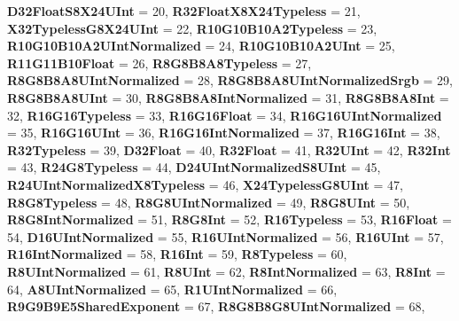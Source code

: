 \begin{DoxyCompactItemize}
\newline
{\bfseries D32\+Float\+S8\+X24\+U\+Int} = 20, 
{\bfseries R32\+Float\+X8\+X24\+Typeless} = 21, 
{\bfseries X32\+Typeless\+G8\+X24\+U\+Int} = 22, 
{\bfseries R10\+G10\+B10\+A2\+Typeless} = 23, 
\newline
{\bfseries R10\+G10\+B10\+A2\+U\+Int\+Normalized} = 24, 
{\bfseries R10\+G10\+B10\+A2\+U\+Int} = 25, 
{\bfseries R11\+G11\+B10\+Float} = 26, 
{\bfseries R8\+G8\+B8\+A8\+Typeless} = 27, 
\newline
{\bfseries R8\+G8\+B8\+A8\+U\+Int\+Normalized} = 28, 
{\bfseries R8\+G8\+B8\+A8\+U\+Int\+Normalized\+Srgb} = 29, 
{\bfseries R8\+G8\+B8\+A8\+U\+Int} = 30, 
{\bfseries R8\+G8\+B8\+A8\+Int\+Normalized} = 31, 
\newline
{\bfseries R8\+G8\+B8\+A8\+Int} = 32, 
{\bfseries R16\+G16\+Typeless} = 33, 
{\bfseries R16\+G16\+Float} = 34, 
{\bfseries R16\+G16\+U\+Int\+Normalized} = 35, 
\newline
{\bfseries R16\+G16\+U\+Int} = 36, 
{\bfseries R16\+G16\+Int\+Normalized} = 37, 
{\bfseries R16\+G16\+Int} = 38, 
{\bfseries R32\+Typeless} = 39, 
\newline
{\bfseries D32\+Float} = 40, 
{\bfseries R32\+Float} = 41, 
{\bfseries R32\+U\+Int} = 42, 
{\bfseries R32\+Int} = 43, 
\newline
{\bfseries R24\+G8\+Typeless} = 44, 
{\bfseries D24\+U\+Int\+Normalized\+S8\+U\+Int} = 45, 
{\bfseries R24\+U\+Int\+Normalized\+X8\+Typeless} = 46, 
{\bfseries X24\+Typeless\+G8\+U\+Int} = 47, 
\newline
{\bfseries R8\+G8\+Typeless} = 48, 
{\bfseries R8\+G8\+U\+Int\+Normalized} = 49, 
{\bfseries R8\+G8\+U\+Int} = 50, 
{\bfseries R8\+G8\+Int\+Normalized} = 51, 
\newline
{\bfseries R8\+G8\+Int} = 52, 
{\bfseries R16\+Typeless} = 53, 
{\bfseries R16\+Float} = 54, 
{\bfseries D16\+U\+Int\+Normalized} = 55, 
\newline
{\bfseries R16\+U\+Int\+Normalized} = 56, 
{\bfseries R16\+U\+Int} = 57, 
{\bfseries R16\+Int\+Normalized} = 58, 
{\bfseries R16\+Int} = 59, 
\newline
{\bfseries R8\+Typeless} = 60, 
{\bfseries R8\+U\+Int\+Normalized} = 61, 
{\bfseries R8\+U\+Int} = 62, 
{\bfseries R8\+Int\+Normalized} = 63, 
\newline
{\bfseries R8\+Int} = 64, 
{\bfseries A8\+U\+Int\+Normalized} = 65, 
{\bfseries R1\+U\+Int\+Normalized} = 66, 
{\bfseries R9\+G9\+B9\+E5\+Shared\+Exponent} = 67, 
\newline
{\bfseries R8\+G8\+B8\+G8\+U\+Int\+Normalized} = 68, 

\end{DoxyCompactItemize}
